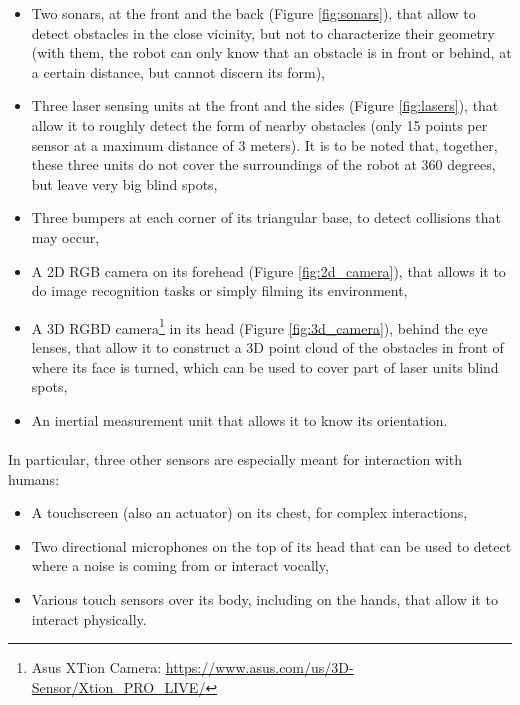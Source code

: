 \begin{itemize}
  \item Two sonars, at the front and the back (Figure \ref{fig:sonars}), that allow to detect obstacles in the close vicinity, but not to characterize their geometry (with them, the robot can only know that an obstacle is in front or behind, at a certain distance, but cannot discern its form),
  \item Three laser sensing units at the front and the sides (Figure \ref{fig:lasers}), that allow it to roughly detect the form of nearby obstacles (only 15 points per sensor at a maximum distance of 3 meters). It is to be noted that, together, these three units do not cover the surroundings of the robot at 360 degrees, but leave very big blind spots,
  \item Three bumpers at each corner of its triangular base, to detect collisions that may occur,
  \item A 2D RGB camera on its forehead (Figure \ref{fig:2d_camera}), that allows it to do image recognition tasks or simply filming its environment,
  \item A 3D RGBD camera\footnote{Asus XTion Camera: \url{https://www.asus.com/us/3D-Sensor/Xtion_PRO_LIVE/}} in its head (Figure \ref{fig:3d_camera}), behind the eye lenses, that allow it to construct a 3D point cloud of the obstacles in front of where its face is turned, which can be used to cover part of laser units blind spots,
  \item An inertial measurement unit that allows it to know its orientation.
\end{itemize}

\paragraph{} In particular, three other sensors are especially meant for interaction with humans:

\begin{itemize}
  \item A touchscreen (also an actuator) on its chest, for complex interactions,
  \item Two directional microphones on the top of its head that can be used to detect where a noise is coming from or interact vocally,
  \item Various touch sensors over its body, including on the hands, that allow it to interact physically.
\end{itemize}

